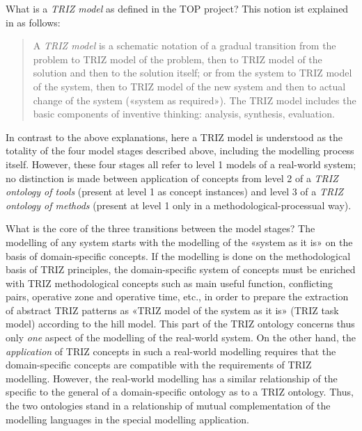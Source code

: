 \documentclass[11pt,a4paper]{article}
\begin{document}
What is a \emph{TRIZ model} as defined in the TOP project?  This notion ist
explained in \cite{TOP-Glossary} as follows:
\begin{quote}
  A \emph{TRIZ model} is a schematic notation of a gradual transition from the
  problem to TRIZ model of the problem, then to TRIZ model of the solution and
  then to the solution itself; or from the system to TRIZ model of the system,
  then to TRIZ model of the new system and then to actual change of the system
  («system as required»). The TRIZ model includes the basic components of
  inventive thinking: analysis, synthesis, evaluation.
\end{quote}
In contrast to the above explanations, here a TRIZ model is understood as the
totality of the four model stages described above, including the modelling
process itself. However, these four stages all refer to level 1 models of a
real-world system; no distinction is made between application of concepts from
level 2 of a \emph{TRIZ ontology of tools} (present at level 1 as concept
instances) and level 3 of a \emph{TRIZ ontology of methods} (present at level
1 only in a methodological-processual way).

What is the core of the three transitions between the model stages?  The
modelling of any system starts with the modelling of the «system as it is» on
the basis of domain-specific concepts. If the modelling is done on the
methodological basis of TRIZ principles, the domain-specific system of
concepts must be enriched with TRIZ methodological concepts such as main
useful function, conflicting pairs, operative zone and operative time, etc.,
in order to prepare the extraction of abstract TRIZ patterns as «TRIZ model of
the system as it is» (TRIZ task model) according to the hill model. This part
of the TRIZ ontology concerns thus only \emph{one} aspect of the modelling of
the real-world system. On the other hand, the \emph{application} of TRIZ
concepts in such a real-world modelling requires that the domain-specific
concepts are compatible with the requirements of TRIZ modelling. However, the
real-world modelling has a similar relationship of the specific to the general
of a domain-specific ontology as to a TRIZ ontology. Thus, the two ontologies
stand in a relationship of mutual complementation of the modelling languages
in the special modelling application.
\end{document}
